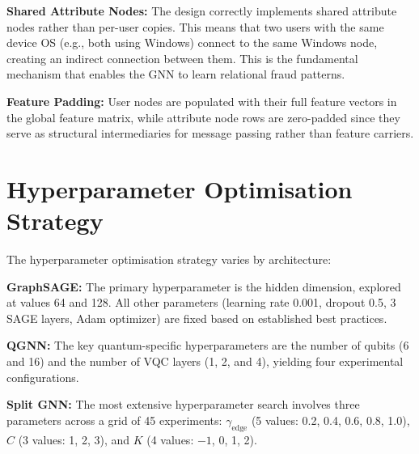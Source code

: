 \textbf{Shared Attribute Nodes:} The design correctly implements shared attribute nodes rather than per-user copies. This means that two users with the same device OS (e.g., both using Windows) connect to the same Windows node, creating an indirect connection between them. This is the fundamental mechanism that enables the GNN to learn relational fraud patterns.

\textbf{Feature Padding:} User nodes are populated with their full feature vectors in the global feature matrix, while attribute node rows are zero-padded since they serve as structural intermediaries for message passing rather than feature carriers.


\section{Hyperparameter Optimisation Strategy}

The hyperparameter optimisation strategy varies by architecture:

\textbf{GraphSAGE:} The primary hyperparameter is the hidden dimension, explored at values 64 and 128. All other parameters (learning rate 0.001, dropout 0.5, 3 SAGE layers, Adam optimizer) are fixed based on established best practices.

\textbf{QGNN:} The key quantum-specific hyperparameters are the number of qubits (6 and 16) and the number of VQC layers (1, 2, and 4), yielding four experimental configurations.

\textbf{Split GNN:} The most extensive hyperparameter search involves three parameters across a grid of 45 experiments: $\gamma_{\text{edge}}$ (5 values: 0.2, 0.4, 0.6, 0.8, 1.0), $C$ (3 values: 1, 2, 3), and $K$ (4 values: $-1$, 0, 1, 2).

